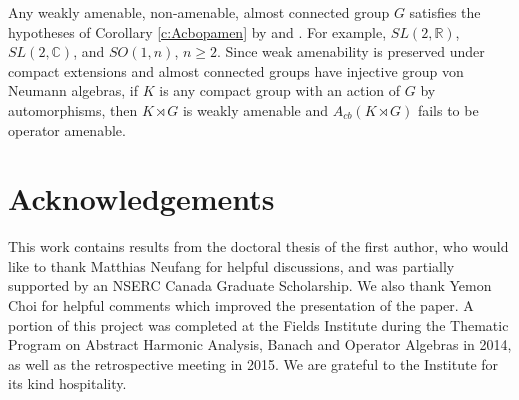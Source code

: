 \documentclass[preprint,12pt]{elsarticle}
\newcommand{\C}{\mathbb{C}}
\newcommand{\R}{\mathbb{R}}
\begin{document}
Any weakly amenable, non-amenable, almost connected group $G$ satisfies
the hypotheses of Corollary \ref{c:Acbopamen} by \cite{Pat3} and \cite[Theorem 5.5]{Rick}. For example, $SL(2,\R)$, $SL(2,\C)$, and $SO(1,n)$, $n\geq 2$. Since weak amenability is preserved under compact extensions \cite[Proposition 1.3]{CH}
and almost connected groups have injective group
von Neumann algebras, if $K$ is any compact group
with an action of $G$ by automorphisms, then $K\rtimes G$ is weakly
amenable and $A_{cb}(K\rtimes G)$ fails to be operator
amenable.





\section*{Acknowledgements}

This work contains results from the doctoral thesis of the first author, who would like to thank Matthias Neufang for helpful discussions, and was partially supported by an NSERC Canada Graduate Scholarship. We also thank Yemon Choi for helpful comments which improved the presentation of the paper. A portion of this project was completed at the Fields Institute during the Thematic Program on Abstract Harmonic Analysis, Banach and Operator Algebras in 2014, as well as the retrospective meeting in 2015. We are grateful to the Institute for its kind hospitality. 
\end{document}
